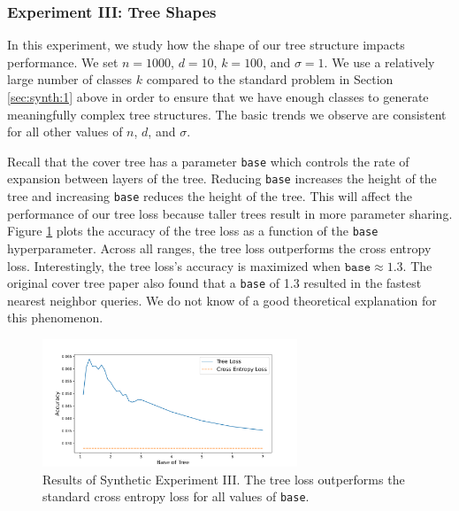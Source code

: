 \documentclass[twoside]{article}
\begin{document}
\subsubsection{Experiment III: Tree Shapes}

In this experiment, we study how the shape of our tree structure impacts performance.
We set $n=1000$, $d=10$, $k=100$, and $\sigma=1$.
We use a relatively large number of classes $k$ compared to the standard problem in Section \ref{sec:synth:1} above in order to ensure that we have enough classes to generate meaningfully complex tree structures.
The basic trends we observe are consistent for all other values of $n$, $d$, and $\sigma$.

Recall that the cover tree has a parameter \texttt{base} which controls the rate of expansion between layers of the tree.
Reducing \texttt{base} increases the height of the tree and increasing \texttt{base} reduces the height of the tree.
This will affect the performance of our tree loss because taller trees result in more parameter sharing.
Figure \ref{fig:ct:acc} plots the accuracy of the tree loss as a function of the \texttt{base} hyperparameter.
Across all ranges, the tree loss outperforms the cross entropy loss.
Interestingly, the tree loss's accuracy is maximized when $\texttt{base}\approx1.3$.
The original cover tree paper \citep{beygelzimer2006cover} also found that a \texttt{base} of 1.3 resulted in the fastest nearest neighbor queries.
We do not know of a good theoretical explanation for this phenomenon.


\begin{figure}
\includegraphics[width=\columnwidth,height=1.5in]{fig/new_img/accuracy_vs_base.png}
\caption
{
    Results of Synthetic Experiment III.
    The tree loss outperforms the standard cross entropy loss for all values of \texttt{base}.
}
\label{fig:ct:acc}
\end{figure}
\end{document}
